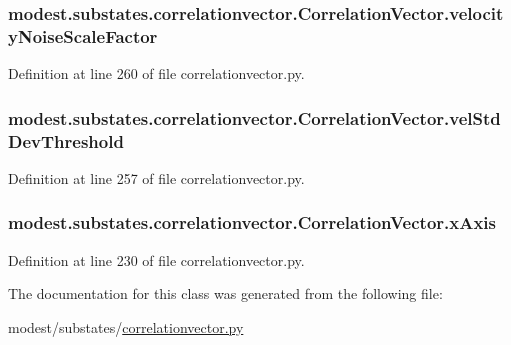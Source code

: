 \subsubsection[{\texorpdfstring{velocity\+Noise\+Scale\+Factor}{velocityNoiseScaleFactor}}]{\setlength{\rightskip}{0pt plus 5cm}modest.\+substates.\+correlationvector.\+Correlation\+Vector.\+velocity\+Noise\+Scale\+Factor}\hypertarget{classmodest_1_1substates_1_1correlationvector_1_1CorrelationVector_a9f6b81403f3e0c73de3b5b721ca673e5}{}\label{classmodest_1_1substates_1_1correlationvector_1_1CorrelationVector_a9f6b81403f3e0c73de3b5b721ca673e5}


Definition at line 260 of file correlationvector.\+py.

\subsubsection[{\texorpdfstring{vel\+Std\+Dev\+Threshold}{velStdDevThreshold}}]{\setlength{\rightskip}{0pt plus 5cm}modest.\+substates.\+correlationvector.\+Correlation\+Vector.\+vel\+Std\+Dev\+Threshold}\hypertarget{classmodest_1_1substates_1_1correlationvector_1_1CorrelationVector_a2a0c78f9d00f305e6143fb8fbf73fc2f}{}\label{classmodest_1_1substates_1_1correlationvector_1_1CorrelationVector_a2a0c78f9d00f305e6143fb8fbf73fc2f}


Definition at line 257 of file correlationvector.\+py.

\subsubsection[{\texorpdfstring{x\+Axis}{xAxis}}]{\setlength{\rightskip}{0pt plus 5cm}modest.\+substates.\+correlationvector.\+Correlation\+Vector.\+x\+Axis}\hypertarget{classmodest_1_1substates_1_1correlationvector_1_1CorrelationVector_a5fe4b7582cf8dae6736ab3fbacf7a781}{}\label{classmodest_1_1substates_1_1correlationvector_1_1CorrelationVector_a5fe4b7582cf8dae6736ab3fbacf7a781}


Definition at line 230 of file correlationvector.\+py.



The documentation for this class was generated from the following file\+:\begin{DoxyCompactItemize}
\item 
modest/substates/\hyperlink{correlationvector_8py}{correlationvector.\+py}\end{DoxyCompactItemize}

